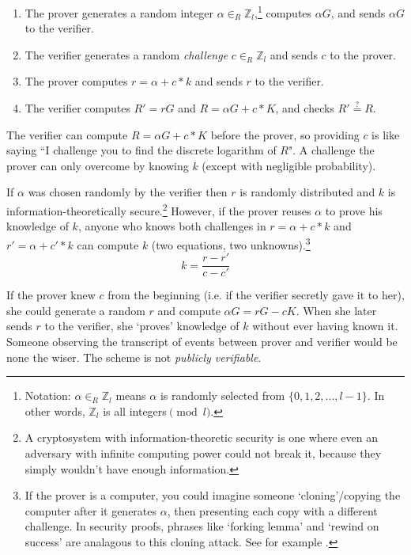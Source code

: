 \begin{enumerate}
	\item The prover generates a random integer \(\alpha \in_R \mathbb{Z}_l\),\footnote{\label{notation3_note}Notation: \(\alpha \in_R \mathbb{Z}_l\) means $\alpha$ is randomly selected from \(\{0,1,2,...,l-1\}\). In other words, $\mathbb{Z}_l$ is all integers$\pmod l$.} computes $\alpha G$, and sends $\alpha G$ to the verifier.
	\item The verifier generates a random {\em challenge} $c \in_R \mathbb{Z}_l$ and sends $c$ to the prover.
	\item The prover computes $r = \alpha + c*k$ and sends $r$ to the verifier.
	\item The verifier computes $R' = r G$ and $R = \alpha G + c*K$, and checks $R' \stackrel{?}{=} R$.
\end{enumerate}

The verifier can compute $R = \alpha G + c*K$ before the prover, so providing $c$ is like saying ``I challenge you to find the discrete logarithm of $R$". A challenge the prover can only overcome by knowing $k$ (except with negligible probability).

If $\alpha$ was chosen randomly by the verifier then $r$ is randomly distributed \cite{SCOZZAFAVA1993313} and $k$ is information-theoretically secure.\footnote{\label{information_theoretic_note}A cryptosystem with information-theoretic security is one where even an adversary with infinite computing power could not break it, because they simply wouldn’t have enough information.} However, if the prover reuses $\alpha$ to prove his knowledge of $k$, anyone who knows both challenges in $r = \alpha + c*k$ and $r' = \alpha + c'*k$ can compute $k$ (two equations, two unknowns).\footnote{If the prover is a computer, you could imagine someone `cloning'/copying the computer after it generates $\alpha$, then presenting each copy with a different challenge. In security proofs, phrases like `forking lemma' and `rewind on success' are analagous to this cloning attack. See for example \cite{Liu2004}.}
\[ k = \frac{r-r'}{c-c'} \]

If the prover knew $c$ from the beginning (i.e. if the verifier secretly gave it to her), she could generate a random $r$ and compute $\alpha G = r G - c K$. When she later sends $r$ to the verifier, she `proves' knowledge of $k$ without ever having known it. Someone observing the transcript of events between prover and verifier would be none the wiser. The scheme is not {\em publicly verifiable}. \cite{Signatures2015BorromeanRS}\\

